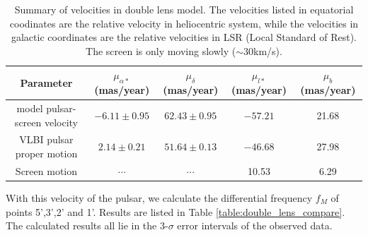 \documentclass[useAMS,usenatbib]{mn2e}
\begin{document}
\begin{table}
\centering
\begin{tabular}{c|cccc}
\hline
Parameter & $\mu_{\alpha*}$(mas/year) & $\mu_{\delta}$(mas/year) &
$\mu_{l*}$(mas/year) & $\mu_b$ (mas/year)\\
\hline
model pulsar-screen velocity & $-6.11 \pm 0.95$  & $62.43 \pm 0.95$  & $-57.21$ & 21.68 \\
VLBI pulsar proper motion & $2.14 \pm 0.21$ & $51.64 \pm 0.13$ & $-46.68$ & 27.98\\
Screen motion & $\cdots$ & $\cdots$  & 10.53 & 6.29 \\
\hline
\end{tabular}
\caption{Summary of velocities in double lens model. The velocities
listed in equatorial coodinates are the relative velocity in
heliocentric system, while the velocities in galactic coordinates are
the relative velocities in LSR (Local Standard of Rest). The screen is
only moving slowly ($\sim 30$km/s).
}
\label{Table:velocity}
\end{table}





With this velocity of the pulsar, we calculate the differential
frequency $f_M$ of points 5',3',2' and 1'. Results are listed in Table
\ref{table:double_lens_compare}. The calculated results all lie in the
3-$\sigma$ error intervals of the observed data. 
\end{document}
